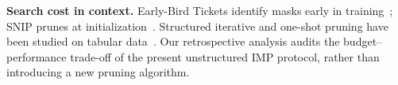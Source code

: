 \noindent\textbf{Search cost in context.}
Early-Bird Tickets identify masks early in training~\cite{you2020earlybird}; SNIP prunes at initialization~\cite{lee2019snip}. Structured iterative and one-shot pruning have been studied on tabular data~\cite{bluteau2022tabular}. Our retrospective analysis audits the budget--performance trade-off of the present unstructured IMP protocol, rather than introducing a new pruning algorithm.

